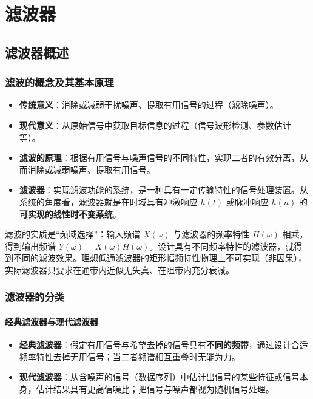 
\chapter{滤波器}

\section{滤波器概述}

\subsection{滤波的概念及其基本原理}
\begin{itemize}
\item \textbf{传统意义}：消除或减弱干扰噪声、提取有用信号的过程（滤除噪声）。
\item \textbf{现代意义}：从原始信号中获取目标信息的过程（信号波形检测、参数估计等）。
\item \textbf{滤波的原理}：根据有用信号与噪声信号的不同特性，实现二者的有效分离，从而消除或减弱噪声、提取有用信号。
\item \textbf{滤波器}：实现滤波功能的系统，是一种具有一定传输特性的信号处理装置。从系统的角度看，滤波器就是在时域具有冲激响应 $h(t)$ 或脉冲响应 $h(n)$ 的\textbf{可实现的线性时不变系统}。
\end{itemize}

滤波的实质是“频域选择”：输入频谱 $X(\omega)$ 与滤波器的频率特性 $H(\omega)$ 相乘，得到输出频谱 $Y(\omega)=X(\omega)H(\omega)$。设计具有不同频率特性的滤波器，就得到不同的滤波效果。理想低通滤波器的矩形幅频特性物理上不可实现（非因果），实际滤波器只要求在通带内近似无失真、在阻带内充分衰减。

\subsection{滤波器的分类}

\subsubsection{经典滤波器与现代滤波器}
\begin{itemize}
\item \textbf{经典滤波器}：假定有用信号与希望去掉的信号具有\textbf{不同的频带}，通过设计合适频率特性去掉无用信号；当二者频谱相互重叠时无能为力。
\item \textbf{现代滤波器}：从含噪声的信号（数据序列）中估计出信号的某些特征或信号本身，估计结果具有更高信噪比；把信号与噪声都视为随机信号处理。
\end{itemize}

